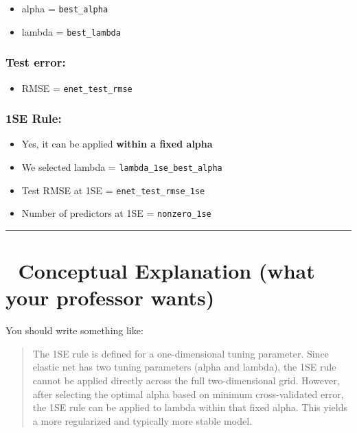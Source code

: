 \documentclass[
]{article}
\providecommand{\tightlist}{%
  \setlength{\itemsep}{0pt}\setlength{\parskip}{0pt}}
\begin{document}
\begin{itemize}
\tightlist
\item
  alpha = \texttt{best\_alpha}
\item
  lambda = \texttt{best\_lambda}
\end{itemize}

\subsubsection{Test error:}\label{test-error}

\begin{itemize}
\tightlist
\item
  RMSE = \texttt{enet\_test\_rmse}
\end{itemize}

\subsubsection{1SE Rule:}\label{se-rule}

\begin{itemize}
\tightlist
\item
  Yes, it can be applied \textbf{within a fixed alpha}
\item
  We selected lambda = \texttt{lambda\_1se\_best\_alpha}
\item
  Test RMSE at 1SE = \texttt{enet\_test\_rmse\_1se}
\item
  Number of predictors at 1SE = \texttt{nonzero\_1se}
\end{itemize}

\begin{center}\rule{0.5\linewidth}{0.5pt}\end{center}

\section{🧠 Conceptual Explanation (what your professor
wants)}\label{conceptual-explanation-what-your-professor-wants}

You should write something like:

\begin{quote}
The 1SE rule is defined for a one-dimensional tuning parameter. Since
elastic net has two tuning parameters (alpha and lambda), the 1SE rule
cannot be applied directly across the full two-dimensional grid.
However, after selecting the optimal alpha based on minimum
cross-validated error, the 1SE rule can be applied to lambda within that
fixed alpha. This yields a more regularized and typically more stable
model.
\end{quote}
\end{document}
